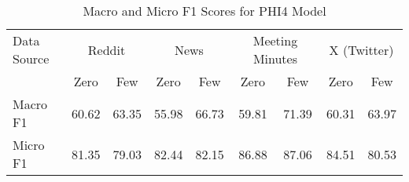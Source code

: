 \begin{table}[htbp]
\centering
\begin{tabular}{l *{8}{c}}
\toprule
Data Source & \multicolumn{2}{c}{Reddit} & \multicolumn{2}{c}{News} & \multicolumn{2}{c}{Meeting Minutes} & \multicolumn{2}{c}{X (Twitter)} \\
& Zero & Few & Zero & Few & Zero & Few & Zero & Few \\
\midrule
Macro F1 & 60.62 & 63.35 & 55.98 & 66.73 & 59.81 & 71.39 & 60.31 & 63.97 \\
Micro F1 & 81.35 & 79.03 & 82.44 & 82.15 & 86.88 & 87.06 & 84.51 & 80.53 \\
\bottomrule
\end{tabular}
\centering\caption{Macro and Micro F1 Scores for PHI4 Model}
\label{tab:phi4_macro_micro}
\end{table}